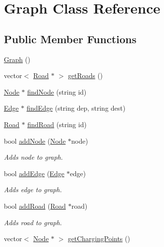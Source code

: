 \hypertarget{class_graph}{}\section{Graph Class Reference}
\label{class_graph}
\subsection*{Public Member Functions}
\begin{DoxyCompactItemize}
\item 
\mbox{\hyperlink{class_graph_ae4c72b8ac4d693c49800a4c7e273654f}{Graph}} ()
\item 
vector$<$ \mbox{\hyperlink{class_road}{Road}} $\ast$ $>$ \mbox{\hyperlink{class_graph_a95b76b429415815ffe5d14250452e313}{get\+Roads}} ()
\item 
\mbox{\hyperlink{class_node}{Node}} $\ast$ \mbox{\hyperlink{class_graph_afdc074fadabe848450ff8fac1c555f8b}{find\+Node}} (string id)
\item 
\mbox{\hyperlink{class_edge}{Edge}} $\ast$ \mbox{\hyperlink{class_graph_aa170b2747ece61cb271ef050357f2a75}{find\+Edge}} (string dep, string dest)
\item 
\mbox{\hyperlink{class_road}{Road}} $\ast$ \mbox{\hyperlink{class_graph_ae4b8a4be11b1fcda91667400e127848d}{find\+Road}} (string id)
\item 
bool \mbox{\hyperlink{class_graph_ae89c94dba0a869ea715299c5d009a755}{add\+Node}} (\mbox{\hyperlink{class_node}{Node}} $\ast$node)
\begin{DoxyCompactList}\small\item\em Adds node to graph. \end{DoxyCompactList}\item 
bool \mbox{\hyperlink{class_graph_ae89cdc4fa0cc56d265ca7488f8bfa72c}{add\+Edge}} (\mbox{\hyperlink{class_edge}{Edge}} $\ast$edge)
\begin{DoxyCompactList}\small\item\em Adds edge to graph. \end{DoxyCompactList}\item 
bool \mbox{\hyperlink{class_graph_a25d56584978abf41188f9c6c1732f19f}{add\+Road}} (\mbox{\hyperlink{class_road}{Road}} $\ast$road)
\begin{DoxyCompactList}\small\item\em Adds road to graph. \end{DoxyCompactList}\item 
vector$<$ \mbox{\hyperlink{class_node}{Node}} $\ast$ $>$ \mbox{\hyperlink{class_graph_a22c9dd0bd46bff0107f8414980c28749}{get\+Charging\+Points}} ()

\end{DoxyCompactItemize}
